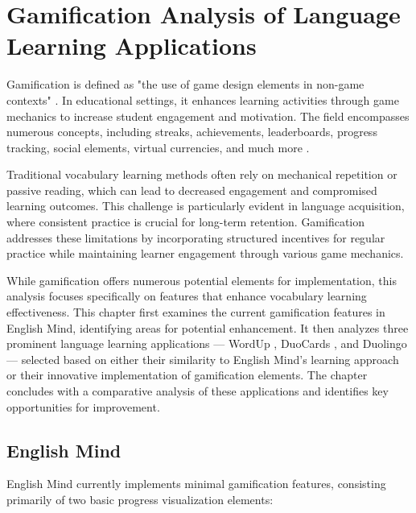 \chapter{Gamification Analysis of Language Learning Applications}

Gamification is defined as "the use of game design elements in non-game contexts" \cite{cite:deterding2011_gamefulness}. In educational settings, it enhances learning activities through game mechanics to increase student engagement and motivation. The field encompasses numerous concepts, including streaks, achievements, leaderboards, progress tracking, social elements, virtual currencies, and much more \cite{cite:govender2021_gamification_elements_in_language_learning_apps}.

Traditional vocabulary learning methods often rely on mechanical repetition or passive reading, which can lead to decreased engagement and compromised learning outcomes. This challenge is particularly evident in language acquisition, where consistent practice is crucial for long-term retention. Gamification addresses these limitations by incorporating structured incentives for regular practice while maintaining learner engagement through various game mechanics.

While gamification offers numerous potential elements for implementation, this analysis focuses specifically on features that enhance vocabulary learning effectiveness. This chapter first examines the current gamification features in English Mind, identifying areas for potential enhancement. It then analyzes three prominent language learning applications — WordUp \cite{cite:wordup}, DuoCards \cite{cite:duocards}, and Duolingo \cite{cite:duolingo} — selected based on either their similarity to English Mind's learning approach or their innovative implementation of gamification elements. The chapter concludes with a comparative analysis of these applications and identifies key opportunities for improvement.\newpage

\section{English Mind}

English Mind currently implements minimal gamification features, consisting primarily of two basic progress visualization elements:

